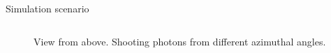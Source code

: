\begin{frame}[fragile]{Simulation scenario}
\begin{columns}
\begin{column}{0.5\textwidth}
\begin{figure}
        \caption{View from above. Shooting photons from different azimuthal angles.}
      \end{figure}
    \end{column}
  \end{columns}
\end{frame}

%
%
%
%
%

